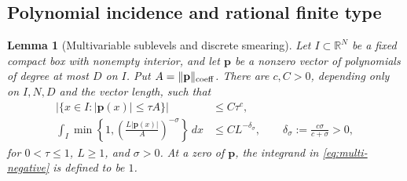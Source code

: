 \documentclass[11pt]{article}
\numberwithin{equation}{section}
\newtheorem{lemma}[theorem]{Lemma}
\theoremstyle{remark}
\theoremstyle{definition}
\newcommand{\R}{\mathbb R}
\newcommand{\norm}[1]{\lVert #1\rVert}
\newcommand{\abs}[1]{\lvert #1\rvert}
\begin{document}
\subsection{Polynomial incidence and rational finite type}

\begin{lemma}[Multivariable sublevels and discrete smearing]
\label{lem:multi-sublevel}
Let $I\subset\R^N$ be a fixed compact box with nonempty interior, and let
$\mathbf p$ be a nonzero vector of polynomials of degree at most $D$ on
$I$.  Put $A=\norm{\mathbf p}_{\rm coeff}$.  There are $c,C>0$,
depending only on $I,N,D$ and the vector length, such that
\begin{align}
 |\{x\in I:\abs{\mathbf p(x)}\le\tau A\}|&\le C\tau^c,
 \label{eq:multi-sublevel}\\
 \int_I\min\left\{1,
   \left(\frac{L\abs{\mathbf p(x)}}{A}\right)^{-\sigma}\right\}\,dx
 &\le C L^{-\delta_\sigma},
 \qquad \delta_\sigma:=\frac{c\sigma}{c+\sigma}>0,
 \label{eq:multi-negative}
\end{align}
for $0<\tau\le1$, $L\ge1$, and $\sigma>0$.  At a zero of
$\mathbf p$, the integrand in \eqref{eq:multi-negative} is defined to be
$1$.


\end{lemma}
\end{document}
